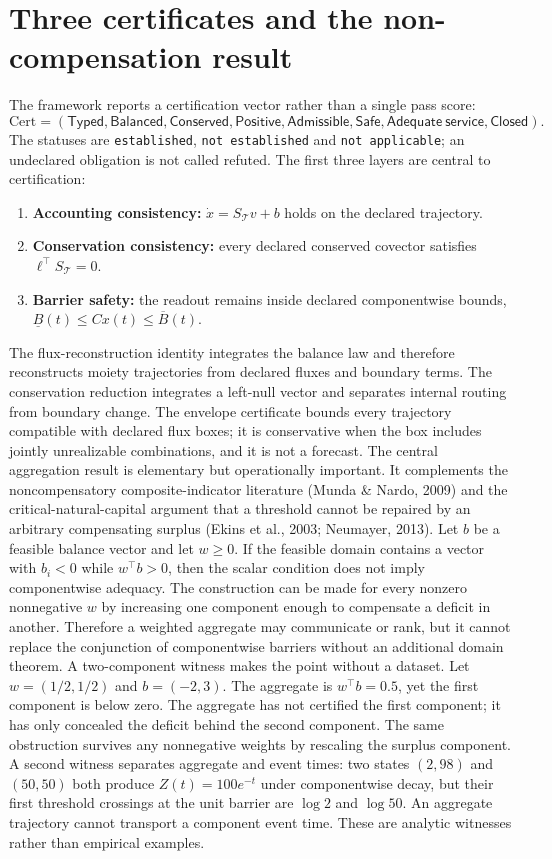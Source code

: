 \documentclass[11pt]{article}
\begin{document}
\section{Three certificates and the non-compensation result}
The framework reports a certification vector rather than a single pass score:
\[\mathrm{Cert}=(\mathsf{Typed},\mathsf{Balanced},\mathsf{Conserved},\mathsf{Positive},\mathsf{Admissible},\mathsf{Safe},\mathsf{Adequate\ service},\mathsf{Closed}).\]
The statuses are \texttt{established}, \texttt{not established} and \texttt{not applicable}; an undeclared obligation is not called refuted. The first three layers are central to certification:
\begin{enumerate}
\item \textbf{Accounting consistency:} \(\dot x=S_{\mathcal T}v+b\) holds on the declared trajectory.
\item \textbf{Conservation consistency:} every declared conserved covector satisfies \(\ell^\top S_{\mathcal T}=0\).
\item \textbf{Barrier safety:} the readout remains inside declared componentwise bounds, \(\underline B(t)\le Cx(t)\le\overline B(t)\).
\end{enumerate}
The flux-reconstruction identity integrates the balance law and therefore reconstructs moiety trajectories from declared fluxes and boundary terms. The conservation reduction integrates a left-null vector and separates internal routing from boundary change. The envelope certificate bounds every trajectory compatible with declared flux boxes; it is conservative when the box includes jointly unrealizable combinations, and it is not a forecast.
The central aggregation result is elementary but operationally important. It complements the noncompensatory composite-indicator literature (Munda \& Nardo, 2009) and the critical-natural-capital argument that a threshold cannot be repaired by an arbitrary compensating surplus (Ekins et al., 2003; Neumayer, 2013). Let \(b\) be a feasible balance vector and let \(w\ge0\). If the feasible domain contains a vector with \(b_i<0\) while \(w^\top b>0\), then the scalar condition does not imply componentwise adequacy. The construction can be made for every nonzero nonnegative \(w\) by increasing one component enough to compensate a deficit in another. Therefore a weighted aggregate may communicate or rank, but it cannot replace the conjunction of componentwise barriers without an additional domain theorem.
A two-component witness makes the point without a dataset. Let \(w=(1/2,1/2)\) and \(b=(-2,3)\). The aggregate is \(w^\top b=0.5\), yet the first component is below zero. The aggregate has not certified the first component; it has only concealed the deficit behind the second component. The same obstruction survives any nonnegative weights by rescaling the surplus component. A second witness separates aggregate and event times: two states \((2,98)\) and \((50,50)\) both produce \(Z(t)=100e^{-t}\) under componentwise decay, but their first threshold crossings at the unit barrier are \(\log 2\) and \(\log 50\). An aggregate trajectory cannot transport a component event time. These are analytic witnesses rather than empirical examples.
\end{document}
